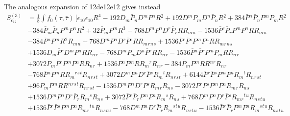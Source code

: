 The analogous expansion of 12de12e12 gives instead 
\begin{align} \label{eq:epepR4-expand}
S^{(3)}_{\epsilon_{12}} &= \frac{1}{8} \int f_0(\tau,\bar{\tau})\,  \bigg [  \epsilon_{10} \epsilon_{10}  R^4 -192 D{}_{m}\bar P{}_{n} D{}^{m}P{}^{n} R{}^{2} + 192 D{}^{m}P{}_{m} D{}^{n}\bar P{}_{n} R{}^{2} 
+ 384 \bar P{}^{n} \bar P{}_{n} P{}^{m} P{}_{m} R{}^{2} 
\nonumber \\& 
- 384 \bar P{}_{m} \bar P{}_{n} P{}^{m} P{}^{n} R{}^{2} 
+ 32 \bar P{}_{m} P{}^{m} R{}^{3} - 768 D{}^{m}P{}^{n} D{}^{r}\bar P{}_{r} R R{}_{m}{}_{n} 
- 1536 \bar P{}^{r} \bar P{}_{r} P{}^{m} P{}^{n} R R{}_{m}{}_{n} 
\nonumber \\&
- 384 \bar P{}^{n} P{}^{m} R{}^{2} R{}_{m}{}_{n}
 + 768 D{}^{m}P{}^{n} D{}^{r}\bar P{}^{s} R R{}_{m}{}_{r}{}_{n}{}_{s} 
+ 1536 \bar P{}^{r} \bar P{}^{s} P{}^{m} P{}^{n} R R{}_{m}{}_{r}{}_{n}{}_{s} 
\nonumber \\& 
+ 1536 D{}_{m}\bar P{}^{r} D{}^{m}P{}^{n} R R{}_{n}{}_{r} 
- 768 D{}^{m}P{}_{m} D{}^{n}\bar P{}^{r} R R{}_{n}{}_{r} 
- 1536 \bar P{}^{n} \bar P{}^{r} P{}^{m} P{}_{m} R R{}_{n}{}_{r}
\nonumber \\& 
 + 3072 \bar P{}_{m} \bar P{}^{r} P{}^{m} P{}^{n} R R{}_{n}{}_{r} 
 + 1536 \bar P{}^{n} P{}^{m} R R{}_{m}{}^{r} R{}_{n}{}_{r}
 - 384 \bar P{}_{m} P{}^{m} R R{}^{n}{}^{r} R{}_{n}{}_{r} 
 \nonumber \\& 
 - 768 \bar P{}^{n} P{}^{m} R R{}_{m}{}^{r}{}^{s}{}^{t} R{}_{n}{}_{r}{}_{s}{}_{t} 
 + 3072 D{}^{m}P{}^{n} D{}^{r}\bar P{}^{s} R{}_{m}{}^{t} R{}_{n}{}_{r}{}_{s}{}_{t} 
 + 6144 \bar P{}^{r} \bar P{}^{s} P{}^{m} P{}^{n} R{}_{m}{}^{t} R{}_{n}{}_{r}{}_{s}{}_{t}
 \nonumber \\& 
 + 96 \bar P{}_{m} P{}^{m} R R{}^{n}{}^{r}{}^{s}{}^{t} R{}_{n}{}_{r}{}_{s}{}_{t} 
 - 1536 D{}^{m}P{}^{n} D{}^{r}\bar P{}^{s} R{}_{m}{}_{r} R{}_{n}{}_{s} 
 - 3072 \bar P{}^{r} \bar P{}^{s} P{}^{m} P{}^{n} R{}_{m}{}_{r} R{}_{n}{}_{s} 
  \nonumber \\& 
 + 1536 D{}^{m}P{}^{n} D{}^{r}\bar P{}_{r} R{}_{m}{}^{s} R{}_{n}{}_{s} 
 + 3072 \bar P{}^{r} \bar P{}_{r} P{}^{m} P{}^{n} R{}_{m}{}^{s} R{}_{n}{}_{s} 
 + 768 D{}^{m}P{}^{n} D{}^{r}\bar P{}^{s} R{}_{m}{}_{r}{}^{t}{}^{u} R{}_{n}{}_{s}{}_{t}{}_{u} 
  \nonumber \\& 
 + 1536 \bar P{}^{r} \bar P{}^{s} P{}^{m} P{}^{n} R{}_{m}{}_{r}{}^{t}{}^{u} R{}_{n}{}_{s}{}_{t}{}_{u} 
 - 768 D{}^{m}P{}^{n} D{}^{r}\bar P{}_{r} R{}_{m}{}^{s}{}^{t}{}^{u} R{}_{n}{}_{s}{}_{t}{}_{u} 
 - 1536 \bar P{}^{r} \bar P{}_{r} P{}^{m} P{}^{n} R{}_{m}{}^{s}{}^{t}{}^{u} R{}_{n}{}_{s}{}_{t}{}_{u}

\end{align}
